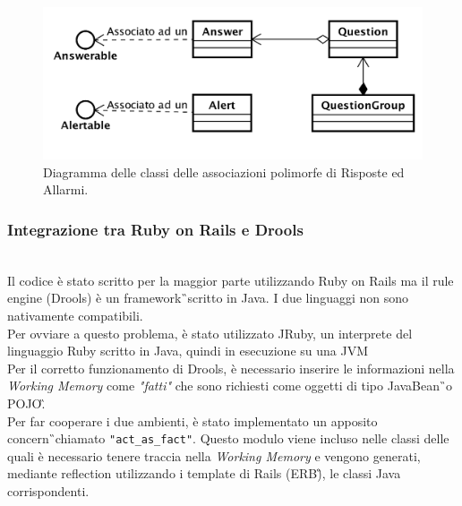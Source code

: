\begin{figure}[H]
	\begin{center}
		\includegraphics[width=14cm]{Pics/diagramma_classi_associazioni_polimorfe.png}
		\caption{Diagramma delle classi delle associazioni polimorfe di Risposte ed Allarmi.}
		\label{fig:DiagrammaClassiAssociazioniPolimorfe}
	\end{center}
\end{figure}

\subsubsection{Integrazione tra Ruby on Rails e Drools}\mbox{} \\

Il codice è stato scritto per la maggior parte utilizzando Ruby on Rails ma il rule engine (Drools) è un \gls{framework}\G\ scritto in Java. I due linguaggi non sono nativamente compatibili. \\
Per ovviare a questo problema, è stato utilizzato JRuby, un interprete del linguaggio Ruby scritto in Java, quindi in esecuzione su una \gls{JVM}\G\. \\
Per il corretto funzionamento di Drools, è necessario inserire le informazioni nella \textit{Working Memory} come \textit{"fatti"} che sono richiesti come oggetti di tipo \gls{JavaBean}\G\ o \gls{POJO}\G.\\
Per far cooperare i due ambienti, è stato implementato un apposito \gls{concern}\G\ chiamato \texttt{"act\_as\_fact"}. Questo modulo viene incluso nelle classi delle quali è necessario tenere traccia nella \textit{Working Memory} e vengono generati, mediante \gls{reflection} utilizzando i template di Rails (\gls{ERB}\G), le classi Java corrispondenti.








